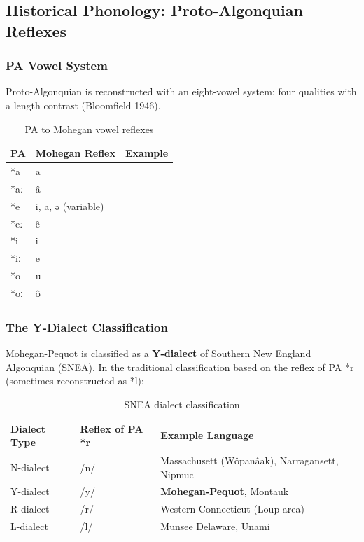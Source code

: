 \subsection{Historical Phonology: Proto-Algonquian Reflexes}

\subsubsection{PA Vowel System}

Proto-Algonquian is reconstructed with an eight-vowel system: four qualities
with a length contrast (Bloomfield 1946).

\begin{table}[h]
\centering
\begin{tabular}{lll}
\toprule
PA & Mohegan Reflex & Example \\
\midrule
*a & a & \\
*aː & â & \\
*e & i, a, ə (variable) & \\
*eː & ê & \\
*i & i & \\
*iː & e & \\
*o & u & \\
*oː & ô & \\
\bottomrule
\end{tabular}
\caption{PA to Mohegan vowel reflexes}
\label{tab:1364-pa-vowels}
\end{table}

\subsubsection{The Y-Dialect Classification}

Mohegan-Pequot is classified as a \textbf{Y-dialect} of Southern New England
Algonquian (SNEA). In the traditional classification based on the reflex of
PA *r (sometimes reconstructed as *l):

\begin{table}[h]
\centering
\begin{tabular}{lll}
\toprule
Dialect Type & Reflex of PA *r & Example Language \\
\midrule
N-dialect & /n/ & Massachusett (Wôpanâak), Narragansett, Nipmuc \\
Y-dialect & /y/ & \textbf{Mohegan-Pequot}, Montauk \\
R-dialect & /r/ & Western Connecticut (Loup area) \\
L-dialect & /l/ & Munsee Delaware, Unami \\
\bottomrule
\end{tabular}
\caption{SNEA dialect classification}
\label{tab:1364-dialects}
\end{table}

